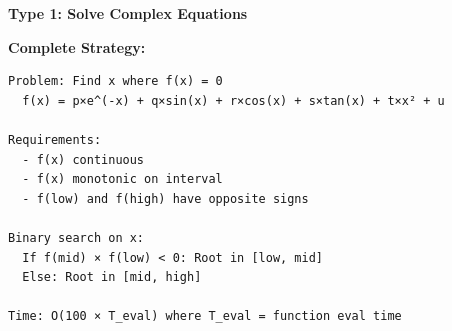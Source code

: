 \documentclass[11pt,a4paper,oneside]{book}
\begin{document}
\begin{tcolorbox}[
    enhanced,breakable,
    colback=warnyellow!10,
    colframe=warnyellow,
    boxrule=2pt,
    arc=4mm,
    title=\textbf{Complete Equation Solving Algorithms}
]
\textbf{Type 1: Solve Complex Equations}

\textbf{Complete Strategy:}
\begin{verbatim}
Problem: Find x where f(x) = 0
  f(x) = p×e^(-x) + q×sin(x) + r×cos(x) + s×tan(x) + t×x² + u
  
Requirements:
  - f(x) continuous
  - f(x) monotonic on interval
  - f(low) and f(high) have opposite signs
  
Binary search on x:
  If f(mid) × f(low) < 0: Root in [low, mid]
  Else: Root in [mid, high]

Time: O(100 × T_eval) where T_eval = function eval time
\end{verbatim}
\end{tcolorbox}
\end{document}
